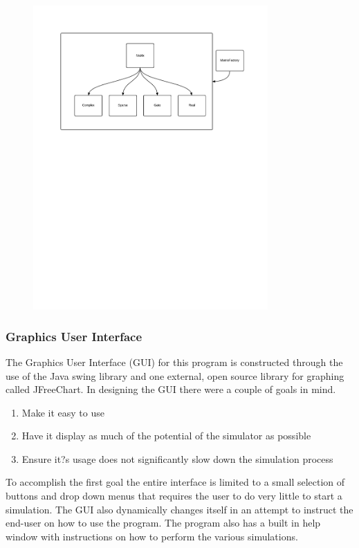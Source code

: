\documentclass[bibliography=totocnumbered, 10pt]{article}
\theoremstyle{NoticeStyle}
\begin{document}
\begin{figure}[H]
\centering
\includegraphics[width=0.8\textwidth]{img/MatrixDesign.pdf}
\caption{}
\end{figure}

\subsubsection{Graphics User Interface}
The Graphics User Interface (GUI) for this program is constructed through the use of the Java swing library and one external, open source library for graphing called JFreeChart. In designing the GUI there were a couple of goals in mind. 
\begin{enumerate}
	\item Make it easy to use
	\item Have it display as much of the potential of the simulator as possible
	\item Ensure it?s usage does not significantly slow down the simulation process
\end{enumerate}
To accomplish the first goal the entire interface is limited to a small selection of buttons and drop down menus that requires the user to do very little to start a simulation. The GUI also dynamically changes itself in an attempt to instruct the end-user on how to use the program. The program also has a built in help window with instructions on how to perform the various simulations.
\end{document}
